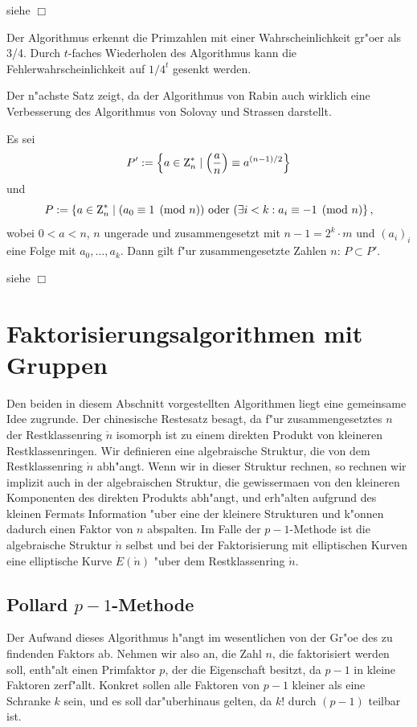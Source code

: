 \beweis 
siehe \cite{frank} \hfill $\Box$

Der Algorithmus erkennt die Primzahlen mit einer Wahrscheinlichkeit
gr"o\3er als 3/4. Durch $t$-faches Wiederholen des Algorithmus kann
die Fehlerwahrscheinlichkeit auf $1/4^t$ gesenkt werden.

Der n"achste Satz zeigt, da\3 der Algorithmus von Rabin auch wirklich
eine Verbesserung des Algorithmus von Solovay und Strassen darstellt.
\begin{satz} 
  Es sei 
  $$ P':=\left\{a\in\einheit{n} \mid \leg{a}{n}\equiv a^{(n-1)/2}\right\}$$
  und
  $$ P:=\left\{a\in\einheit{n} \mid (a_0 \equiv 1 \pmod{n}) \mbox{ oder } 
     (\exists i<k : a_i \equiv -1 \pmod{n}\right\}, $$
  wobei $0<a<n$, $n$ ungerade und zusammengesetzt mit $n-1 = 2^k \cdot m$ und 
  $(a_i)_i$ eine 
  Folge mit $a_0,\ldots, a_k$. Dann gilt f"ur zusammengesetzte
  Zahlen $n$: $P \subset P'$. 
\end{satz}

\beweis 
siehe \cite{frank} \hfill $\Box$

\section{Faktorisierungsalgorithmen mit Gruppen}

Den beiden in diesem Abschnitt vorgestellten Algorithmen liegt eine
gemeinsame Idee zugrunde. Der chinesische Restesatz besagt, da\3 f"ur
zusammengesetztes $n$ der Restklassenring $\ring{n}$ isomorph ist zu einem 
direkten Produkt von kleineren Restklassenringen.  Wir definieren eine 
algebraische Struktur, die von dem Restklassenring $\ring{n}$ abh"angt. Wenn wir
in dieser Struktur rechnen, so rechnen wir implizit auch in der algebraischen
Struktur, die gewisserma\3en von den kleineren Komponenten des
direkten Produkts abh"angt, und erh"alten aufgrund des kleinen Fermats
Information "uber eine der kleinere Strukturen und k"onnen dadurch einen
Faktor von $n$ abspalten. Im Falle der $p-1$-Methode ist die
algebraische Struktur $\ring{n}$ selbst und bei der Faktorisierung mit
elliptischen Kurven eine elliptische Kurve $E(\ring{n})$ "uber dem
Restklassenring $\ring{n}$.

\subsection{Pollard $p-1$-Methode}

Der Aufwand dieses Algorithmus h"angt im wesentlichen von der Gr"o\3e
des zu findenden Faktors ab. Nehmen wir also an, die Zahl $n$, die
faktorisiert werden soll, enth"alt einen Primfaktor $p$, der die
Eigenschaft besitzt, da\3 $p-1$ in kleine Faktoren zerf"allt. Konkret
sollen alle Faktoren von $p-1$ kleiner als eine Schranke $k$ sein, und
es soll dar"uberhinaus gelten, da\3 $k!$ durch $(p-1)$ teilbar ist.

